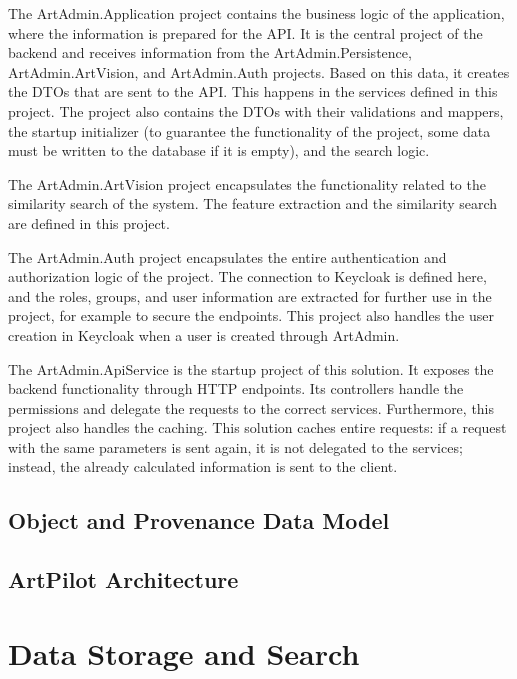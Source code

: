 The ArtAdmin.Application project contains the business logic of the application, where the information is prepared for the API. It is the central project of the backend and receives information from the ArtAdmin.Persistence, ArtAdmin.ArtVision, and ArtAdmin.Auth projects. Based on this data, it creates the DTOs that are sent to the API. This happens in the services defined in this project. The project also contains the DTOs with their validations and mappers, the startup initializer (to guarantee the functionality of the project, some data must be written to the database if it is empty), and the search logic.

The ArtAdmin.ArtVision project encapsulates the functionality related to the similarity search of the system. The feature extraction and the similarity search are defined in this project.

The ArtAdmin.Auth project encapsulates the entire authentication and authorization logic of the project. The connection to Keycloak is defined here, and the roles, groups, and user information are extracted for further use in the project, for example to secure the endpoints. This project also handles the user creation in Keycloak when a user is created through ArtAdmin.

The ArtAdmin.ApiService is the startup project of this solution. It exposes the backend functionality through HTTP endpoints. Its controllers handle the permissions and delegate the requests to the correct services. Furthermore, this project also handles the caching. This solution caches entire requests: if a request with the same parameters is sent again, it is not delegated to the services; instead, the already calculated information is sent to the client.
\subsection{Object and Provenance Data Model}\label{sec:implementation:backend:data-model}

\subsection{ArtPilot Architecture}\label{sec:implementation:backend:artpilot}

\section{Data Storage and Search}\label{sec:implementation:storage}

